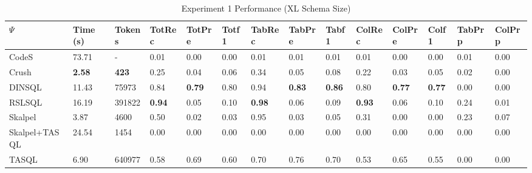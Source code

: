 \begin{table}
\caption{Experiment 1 Performance (XL Schema Size)}
\label{tab:exp1-xl-schema}
\begin{tabular}{llllllllllllll}
\toprule
$\Psi$ & Time (s) & Tokens & TotRec & TotPre & Totf1 & TabRec & TabPre & Tabf1 & ColRec & ColPre & Colf1 & TabPrp & ColPrp \\
\midrule
CodeS & 73.71 & - & 0.01 & 0.00 & 0.00 & 0.01 & 0.01 & 0.01 & 0.01 & 0.00 & 0.00 & 0.01 & 0.00 \\
Crush & \textbf{2.58} & \textbf{423} & 0.25 & 0.04 & 0.06 & 0.34 & 0.05 & 0.08 & 0.22 & 0.03 & 0.05 & 0.02 & 0.00 \\
DINSQL & 11.43 & 75973 & 0.84 & \textbf{0.79} & 0.80 & 0.94 & \textbf{0.83} & \textbf{0.86} & 0.80 & \textbf{0.77} & \textbf{0.77} & 0.00 & 0.00 \\
RSLSQL & 16.19 & 391822 & \textbf{0.94} & 0.05 & 0.10 & \textbf{0.98} & 0.06 & 0.09 & \textbf{0.93} & 0.06 & 0.10 & 0.24 & 0.01 \\
Skalpel & 3.87 & 4600 & 0.50 & 0.02 & 0.03 & 0.95 & 0.03 & 0.05 & 0.31 & 0.00 & 0.00 & 0.23 & 0.07 \\
Skalpel+TASQL & 24.54 & 1454 & 0.00 & 0.00 & 0.00 & 0.00 & 0.00 & 0.00 & 0.00 & 0.00 & 0.00 & 0.00 & 0.00 \\
TASQL & 6.90 & 640977 & 0.58 & 0.69 & 0.60 & 0.70 & 0.76 & 0.70 & 0.53 & 0.65 & 0.55 & 0.00 & 0.00 \\
\bottomrule
\end{tabular}
\end{table}
